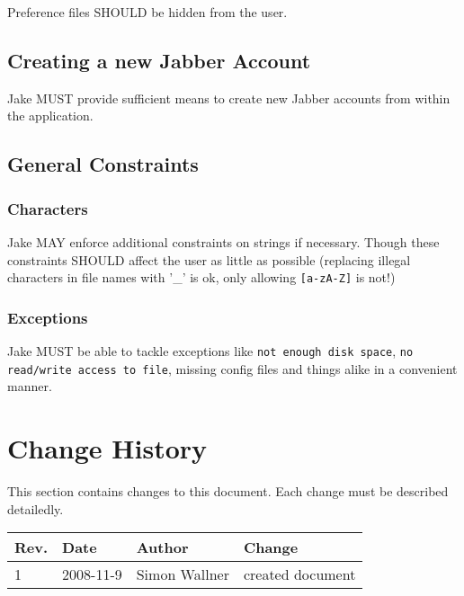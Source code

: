 Preference files SHOULD be hidden from the user.

\subsection{Creating a new Jabber Account}
Jake MUST provide sufficient means to create new Jabber accounts from within the application.

\subsection{General Constraints}
\subsubsection{Characters}
Jake MAY enforce additional constraints on strings if necessary. Though these constraints SHOULD affect the user as little as possible (replacing illegal characters in file names with '\_' is ok, only allowing \texttt{[a-zA-Z]} is not!)

\subsubsection{Exceptions}
Jake  MUST be able to tackle exceptions like \texttt{not enough disk space}, \texttt{no read/write access to file}, missing config files and things alike in a convenient manner. 





\section{Change History}
This section contains changes to this document. Each change must be described detailedly.
\begin{table}[h]
\begin{tabular}{|l|l|l|l|}
\hline
\textbf{Rev.} & \textbf{Date} & \textbf{Author} & \textbf{Change} \\
\hline
1 & 2008-11-9 & Simon Wallner & created document \\
\hline
\end{tabular}
\end{table}






